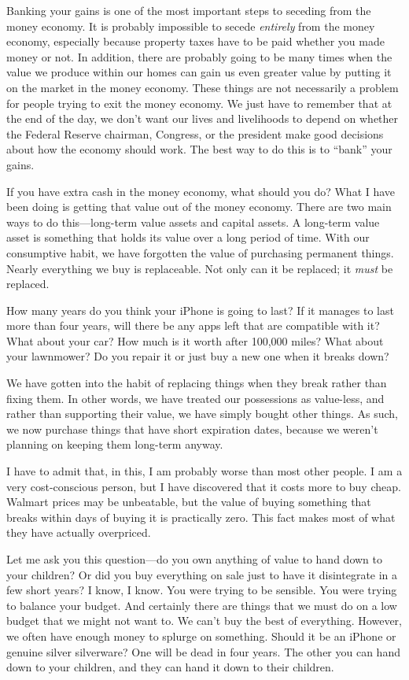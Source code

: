 Banking your gains is
one of the most important steps to seceding from the money economy. It
is probably impossible to secede \textit{entirely} from the money
economy, especially because property taxes have to be paid whether you
made money or not. In addition, there are probably going to be many
times when the value we produce within our homes can gain us even
greater value by putting it on the market in the money economy. These
things are not necessarily a problem for people trying to exit the
money economy. We just have to remember that at the end of the day, we
don’t want our lives and livelihoods to depend on whether the Federal
Reserve chairman, Congress, or the president make good decisions about
how the economy should work. The best way to do this is to “bank” your
gains.

If you have extra cash in the money economy, what should you do?  What I
have been doing is getting that value out of the money economy. There
are two main ways to do this—long-term value assets and capital assets.
A long-term value asset is something that holds its value over a long
period of time. With our consumptive habit, we have forgotten the value
of purchasing permanent things. Nearly everything we buy is
replaceable. Not only can it be replaced; it \textit{must} be replaced.

How many years do you think your iPhone is going to last? If it manages
to last more than four years, will there be any apps left that are
compatible with it? What about your car? How much is it worth after
100,000 miles? What about your lawnmower? Do you repair it or just buy
a new one when it breaks down?

We have gotten into the habit of replacing things when they break rather
than fixing them. In other words, we have treated our possessions as
value-less, and rather than supporting their value, we have simply
bought other things. As such, we now purchase things that have short
expiration dates, because we weren’t planning on keeping them long-term
anyway. 

I have to admit that, in this, I am probably worse than most other
people. I am a very cost-conscious person, but I have discovered that
it costs more to buy cheap. Walmart prices may be unbeatable, but the
value of buying something that breaks within days of buying it is
practically zero.  This fact makes most of what they have actually
overpriced. 

Let me ask you this question—do you own anything of value to hand down
to your children?  Or did you buy everything on sale just to have it
disintegrate in a few short years?  I know, I know. You were trying to
be sensible. You were trying to balance your budget. And certainly
there are things that we must do on a low budget that we might not want
to. We can’t buy the best of everything. However, we often have enough
money to splurge on something. Should it be an iPhone or genuine silver
silverware?  One will be dead in four years. The other you can hand
down to your children, and they can hand it down to their children.

